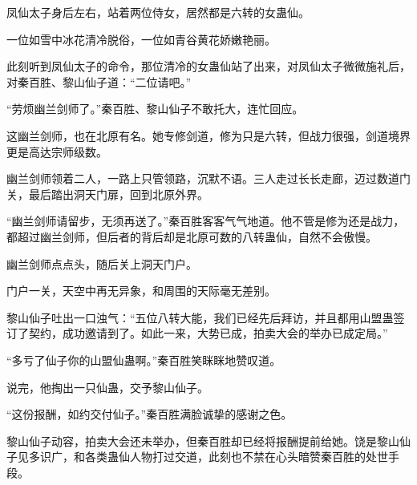 \begin{this_body}
凤仙太子身后左右，站着两位侍女，居然都是六转的女蛊仙。

一位如雪中冰花清冷脱俗，一位如青谷黄花娇嫩艳丽。

此刻听到凤仙太子的命令，那位清冷的女蛊仙站了出来，对凤仙太子微微施礼后，对秦百胜、黎山仙子道：“二位请吧。”

“劳烦幽兰剑师了。”秦百胜、黎山仙子不敢托大，连忙回应。

这幽兰剑师，也在北原有名。她专修剑道，修为只是六转，但战力很强，剑道境界更是高达宗师级数。

幽兰剑师领着二人，一路上只管领路，沉默不语。三人走过长长走廊，迈过数道门关，最后踏出洞天门扉，回到北原外界。

“幽兰剑师请留步，无须再送了。”秦百胜客客气气地道。他不管是修为还是战力，都超过幽兰剑师，但后者的背后却是北原可数的八转蛊仙，自然不会傲慢。

幽兰剑师点点头，随后关上洞天门户。

门户一关，天空中再无异象，和周围的天际毫无差别。

黎山仙子吐出一口浊气：“五位八转大能，我们已经先后拜访，并且都用山盟蛊签订了契约，成功邀请到了。如此一来，大势已成，拍卖大会的举办已成定局。”

“多亏了仙子你的山盟仙蛊啊。”秦百胜笑眯眯地赞叹道。

说完，他掏出一只仙蛊，交予黎山仙子。

“这份报酬，如约交付仙子。”秦百胜满脸诚挚的感谢之色。

黎山仙子动容，拍卖大会还未举办，但秦百胜却已经将报酬提前给她。饶是黎山仙子见多识广，和各类蛊仙人物打过交道，此刻也不禁在心头暗赞秦百胜的处世手段。

\end{this_body}

